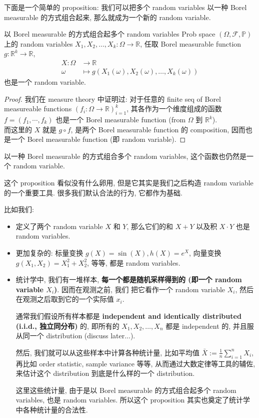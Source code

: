 下面是一个简单的 proposition: 我们可以把多个 random variables 
以一种 Borel measurable 的方式组合起来, 那么就成为一个新的 random variable.
\begin{proposition}{以 Borel measurable 的方式组合起多个 random variables}
    Prob space \((\Omega, \mathcal{F}, \mathbb{P})\) 上的 
    random variables \(X_1, X_2, \ldots, X_k: \Omega \rightarrow \mathbb{R}\),
    任取 Borel measurable function \(g: \mathbb{R}^k \rightarrow \mathbb{R}\), 
    \begin{align*}
        X: \Omega &\rightarrow \mathbb{R} \\
        \omega &\mapsto g(X_1(\omega), X_2(\omega), \ldots, X_k(\omega))
    \end{align*}
    也是一个 random variable.
\end{proposition}
\begin{proof}
    我们在 measure theory 中证明过: 对于任意的 finite seq of Borel measureable functions 
    \( (  {f_i}: \Omega \to \mathbb{R} )_{i=1}^k\), 其各作为一个维度组成的函数
    \(f = (f_1,\cdots, f_k)\) 也是一个 Borel measurable function (from \(\Omega\) 到 \(\mathbb{R}^k\)).\\
    而这里的 \(X\) 就是 \(g \circ f\), 是两个 Borel measurable function 的 composition, 因而也是一个 Borel measurable function (即 random variable).
\end{proof}
\begin{remark}
    以一种 Borel measurable 的方式组合多个 random variables,
 这个函数也仍然是一个 random variable. 

这个 proposition 看似没有什么卵用, 但是它其实是我们之后构造 
random variable 的一个重要工具. 
很多我们默认合法的行为, 它都作为基础.

比如我们:
\begin{itemize}
    \item 定义了两个 random variable \(X\) 和 \(Y\), 那么它们的和 \(X+Y\) 以及积 \(X \cdot Y\) 也是 random variables.
    \item 更加复杂的: 标量变换 \(g(X) = \sin(X), h(X) = e^{X}\), 向量变换 \(g(X_1, X_2) = X_1^2 + X_2^2\), 等等, 都是 random variables.
    \item  统计学中, 
我们有一堆样本, \textbf{每一个都是随机采样得到的 (即一个 random variable $X_i$)}. 因而在观测之前, 我们
把它看作一个 random variable $X_i$, 然后在观测之后取到它的一个实际值 \(x_i\).

通常我们假设所有样本都是 
\textbf{independent and identically distributed (i.i.d., 独立同分布) }的, 即所有的
 \(X_1, X_2, \ldots, X_n\) 都是 independent 的, 并且服从同一个 distribution (discuss later...).

然后, 我们就可以从这些样本中计算各种统计量, 比如平均值 \(\bar{X} :=\frac{1}{n}\sum_{i=1}^n X_i\),
再比如 order statistic, sample variance 等等, 从而通过大数定律等工具的辅佐, 来估计这个 distribution
到底是什么样的一个 distribution.

这里这些统计量, 由于是以 Borel measurable 的方式组合起多个 random variables, 也是 random variables.
所以这个 proposition 其实也奠定了统计学中各种统计量的合法性.

\end{itemize}

\end{remark}
